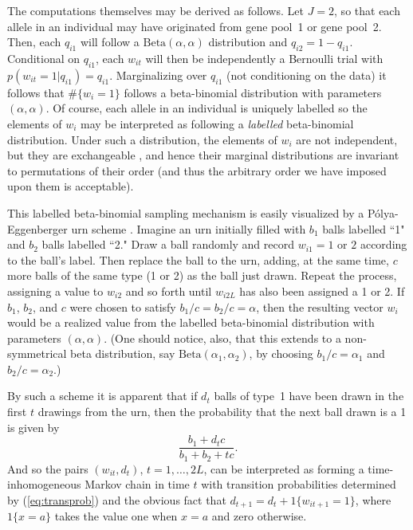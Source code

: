 \documentclass[11pt]{article}
\begin{document}
The computations themselves may be derived as follows.  Let $J=2$, so
that each allele in an individual may have originated from gene
pool~1 or gene pool~2.  Then, each $q_{i1}$ will follow a
$\mathrm{Beta}(\alpha,\alpha)$ distribution and $q_{i2} = 1 - q_{i1}$.
Conditional on
$q_{i1}$, each $w_{it}$ will then be independently a Bernoulli trial with
$p(w_{it} = 1|q_{i1}) = q_{i1}$.  Marginalizing over $q_{i1}$ (not
conditioning on the data) it follows that $\#\{w_i=1\}$ follows a
beta-binomial distribution with parameters $(\alpha,\alpha)$.  Of course,
each allele in an individual is uniquely labelled so the elements of
$w_i$ may be interpreted as following a {\em labelled} beta-binomial
distribution.  Under such a distribution, the elements of $w_i$ are not
independent, but they are exchangeable \cite{deFinetti1972},
and hence their marginal distributions are invariant to permutations of
their order (and thus the arbitrary order we have imposed upon them is
acceptable).  

This labelled beta-binomial sampling mechanism is easily visualized
by a P\'{o}lya-Eggenberger urn scheme
\cite{Feller1957,Johnsonetal1993}.  Imagine an urn
initially filled with $b_1$ balls labelled ``1" and $b_2$ balls labelled
``2."  Draw a ball randomly and record
$w_{i1} = 1$ or $2$ according to the ball's label.  Then replace the
ball to the urn, adding, at the same time, $c$ more balls of the
same type (1 or 2) as the ball just drawn.  Repeat the process, assigning
a value to
$w_{i2}$ and so forth until $w_{i2L}$ has also been assigned a 1 or
2\@.  If
$b_1$,
$b_2$, and $c$ were chosen to satisfy $b_1/c = b_2/c = \alpha$, then the
resulting vector $w_i$ would be a realized value from the labelled
beta-binomial distribution with parameters $(\alpha,\alpha)$.  (One should notice,
also, that this extends to a non-symmetrical beta distribution,
say $\mathrm{Beta}(\alpha_1,\alpha_2)$, by choosing $b_1/c = \alpha_1$ and $b_2/c = 
\alpha_2$.)

By such a scheme it is apparent that if $d_t$ balls of type~1 have been
drawn in the first $t$ drawings from the urn, then the
probability that the next ball drawn is a 1 is given by
\begin{equation}
\frac{b_1 + d_t c}{b_1 + b_2 + tc}.
\label{eq:transprob}
\end{equation}
And so the pairs $(w_{it},d_t)$, $t=1,\ldots,2L$, can be interpreted as
forming a time-inhomogeneous Markov chain in time $t$ with transition
probabilities determined by (\ref{eq:transprob}) and the obvious
fact that $d_{t+1} = d_t + 1\{w_{it+1}=1\}$, where $1\{x=a\}$ takes the
value one when $x=a$ and zero otherwise.  
\end{document}
